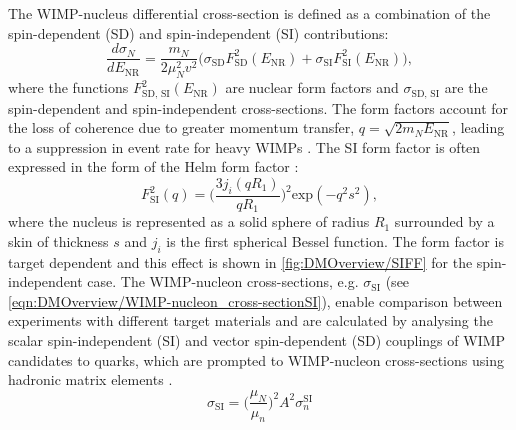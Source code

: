 The WIMP-nucleus differential cross-section is defined as a combination of the spin-dependent (SD) and spin-independent (SI) contributions:
\begin{equation}
    \frac{d\sigma_N}{dE_\text{NR}}=\frac{m_N}{2\mu^2_Nv^2}\biggl(\sigma_\text{SD}F_\text{SD}^2(E_\text{NR})+\sigma_\text{SI}F_\text{SI}^2(E_\text{NR})\biggl),
\end{equation}
where the functions $F_\text{SD, SI}^2(E_\text{NR})$ are nuclear form factors and $\sigma_\text{SD, SI}$ are the spin-dependent and spin-independent cross-sections. The form factors account for the loss of coherence due to greater momentum transfer, $q=\sqrt{2m_NE_\text{NR}}$, leading to a suppression in event rate for heavy WIMPs \cite{Cerdeno:2010jj}. The SI form factor is often expressed in the form of the Helm form factor \cite{edfraser:thesis}:
\begin{equation}
    F_\text{SI}^2(q)=\biggl(\frac{3j_i(qR_1)}{qR_1}\biggl)^2\text{exp}(-q^2s^2),
\end{equation}
where the nucleus is represented as a solid sphere of radius $R_1$ surrounded by a skin of thickness $s$ and $j_i$ is the first spherical Bessel function. The form factor is target dependent and this effect is shown in \autoref{fig:DMOverview/SIFF} for the spin-independent case.
The WIMP-nucleon cross-sections, e.g. $\sigma_\text{SI}$ (see \autoref{eqn:DMOverview/WIMP-nucleon_cross-sectionSI}), enable comparison between experiments with different target materials and are calculated by analysing the scalar spin-independent (SI) and vector spin-dependent (SD) couplings of WIMP candidates to quarks, which are prompted to WIMP-nucleon cross-sections using hadronic matrix elements \cite{edfraser:thesis}.
\begin{equation}\label{eqn:DMOverview/WIMP-nucleon_cross-sectionSI}
    \sigma_\text{SI}=\biggl(\frac{\mu_N}{\mu_n}\biggl)^2A^2\sigma^\text{SI}_n
\end{equation}
